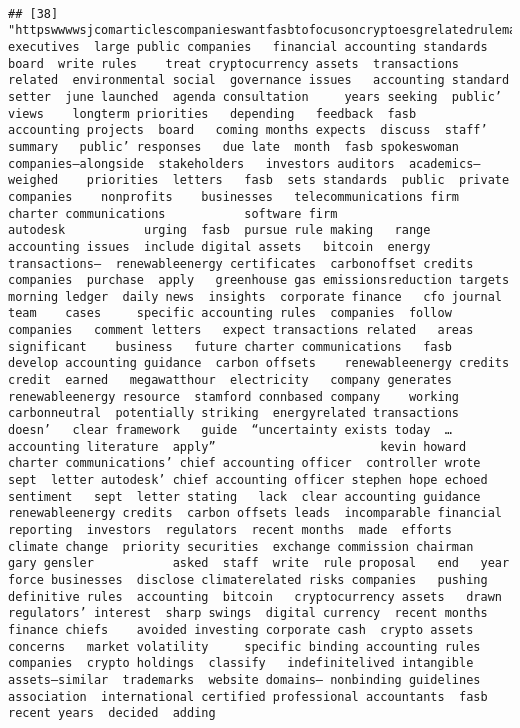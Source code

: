 \documentclass[
]{article}
\begin{document}
\begin{verbatim}
                                                                                                                                                                                                                                                                                                                                                                                                                                                                              
## [38] "httpswwwwsjcomarticlescompanieswantfasbtofocusoncryptoesgrelatedrulemaking executives  large public companies   financial accounting standards board  write rules    treat cryptocurrency assets  transactions related  environmental social  governance issues   accounting standard setter  june launched  agenda consultation     years seeking  public’ views    longterm priorities   depending   feedback  fasb    accounting projects  board   coming months expects  discuss  staff’ summary   public’ responses   due late  month  fasb spokeswoman  companies—alongside  stakeholders   investors auditors  academics— weighed    priorities  letters   fasb  sets standards  public  private companies    nonprofits    businesses   telecommunications firm                       charter communications           software firm                       autodesk           urging  fasb  pursue rule making   range  accounting issues  include digital assets   bitcoin  energy transactions—  renewableenergy certificates  carbonoffset credits  companies  purchase  apply   greenhouse gas emissionsreduction targets   morning ledger  daily news  insights  corporate finance   cfo journal team    cases     specific accounting rules  companies  follow  companies   comment letters   expect transactions related   areas    significant    business   future charter communications   fasb  develop accounting guidance  carbon offsets    renewableenergy credits  credit  earned   megawatthour  electricity   company generates   renewableenergy resource  stamford connbased company    working   carbonneutral  potentially striking  energyrelated transactions  doesn’   clear framework   guide  “uncertainty exists today  …accounting literature  apply”                       kevin howard          charter communications’ chief accounting officer  controller wrote   sept  letter autodesk’ chief accounting officer stephen hope echoed  sentiment   sept  letter stating   lack  clear accounting guidance  renewableenergy credits  carbon offsets leads  incomparable financial reporting  investors  regulators  recent months  made  efforts  climate change  priority securities  exchange commission chairman                       gary gensler           asked  staff  write  rule proposal   end   year   force businesses  disclose climaterelated risks companies   pushing  definitive rules  accounting  bitcoin   cryptocurrency assets   drawn regulators’ interest  sharp swings  digital currency  recent months  finance chiefs    avoided investing corporate cash  crypto assets  concerns   market volatility     specific binding accounting rules companies  crypto holdings  classify   indefinitelived intangible assets—similar  trademarks  website domains— nonbinding guidelines   association  international certified professional accountants  fasb  recent years  decided  adding  
\end{verbatim}
\end{document}
